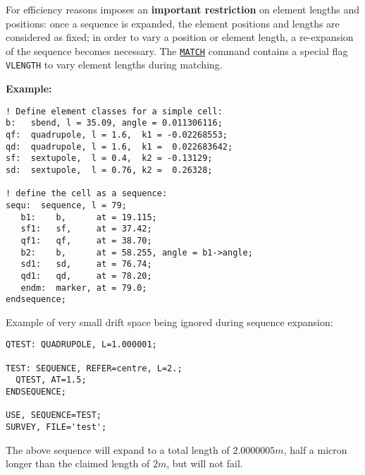 For efficiency reasons \madx imposes an {\bf important restriction}
on element lengths and positions: once a sequence is expanded, the
element positions and lengths are considered as fixed; in order to vary
a position or element length, a re-expansion of the sequence becomes
necessary. The \hyperref[chap:match]{\tt MATCH} command contains a special flag 
{\tt VLENGTH} to vary element lengths during matching.

{\bf Example:}
\begin{verbatim}
! Define element classes for a simple cell:
b:   sbend, l = 35.09, angle = 0.011306116;
qf:  quadrupole, l = 1.6,  k1 = -0.02268553;
qd:  quadrupole, l = 1.6,  k1 =  0.022683642;
sf:  sextupole,  l = 0.4,  k2 = -0.13129;
sd:  sextupole,  l = 0.76, k2 =  0.26328;

! define the cell as a sequence:
sequ:  sequence, l = 79;
   b1:    b,      at = 19.115;
   sf1:   sf,     at = 37.42;
   qf1:   qf,     at = 38.70;
   b2:    b,      at = 58.255, angle = b1->angle;
   sd1:   sd,     at = 76.74;
   qd1:   qd,     at = 78.20;
   endm:  marker, at = 79.0;
endsequence;
\end{verbatim}




Example of very small drift space being ignored during sequence
expansion: 
\begin{verbatim}
QTEST: QUADRUPOLE, L=1.000001;

TEST: SEQUENCE, REFER=centre, L=2.;
  QTEST, AT=1.5;
ENDSEQUENCE;

USE, SEQUENCE=TEST;
SURVEY, FILE='test';
\end{verbatim}
The above sequence will expand to a total length of $2.0000005 m$, half
a micron longer than the claimed length of $2 m$, but will not fail.

